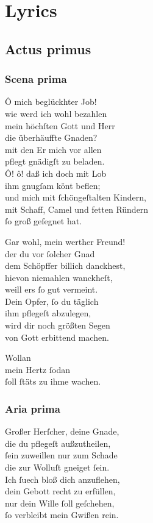 \documentclass{ees}
\newenvironment{lyrics}[1]{%
  \subsection{#1}\nopagebreak%
  \begin{lyricslist}%
  \let\voice\item%
}{%
  \end{lyricslist}%
}
\begin{document}
\setcounter{page}{1}

\chapter{Lyrics}

\section{Actus primus}

\begin{lyrics}{Scena prima}
  \voice[Job]
  Ô mich beglückhter Job!\\
  wie werd ich wohl bezahlen\\
  mein höchſten Gott und Herr\\
  die überhäuffte Gnaden?\\
  mit den Er mich vor allen\\
  pflegt gnädigſt zu beladen.\\
  Ô! ô! daß ich doch mit Lob\\
  ihm gnugſam könt beflen;\\
  und mich mit ſchöngeſtalten Kindern,\\
  mit Schaff, Camel und fetten Ründern\\
  ſo groß geſegnet hat.

  \voice[Eliphas]
  Gar wohl, mein werther Freund!\\
  der du vor ſolcher Gnad\\
  dem Schöpffer billich danckhest,\\
  hievon niemahlen wanckheſt,\\
  weill ers ſo gut vermeint.\\
  Dein Opfer, ſo du täglich\\
  ihm pflegeſt abzulegen,\\
  wird dir noch größten Segen\\
  von Gott erbittend machen.

  \voice[Job]
  Wollan\\
  mein Hertz ſodan\\
  ſoll ſtäts zu ihme wachen.
\end{lyrics}

\begin{lyrics}{Aria prima}
  \voice[Job]
  Großer Herſcher, deine Gnade,\\
  die du pflegeſt außzutheilen,\\
  ſein zuweillen nur zum Schade\\
  die zur Wolluſt gneiget ſein.\\[1ex]
  Ich ſuech bloß dich anzuflehen,\\
  dein Gebott recht zu erfüllen,\\
  nur dein Wille ſoll geſchehen,\\
  ſo verbleibt mein Gwißen rein.
\end{lyrics}
\end{document}
